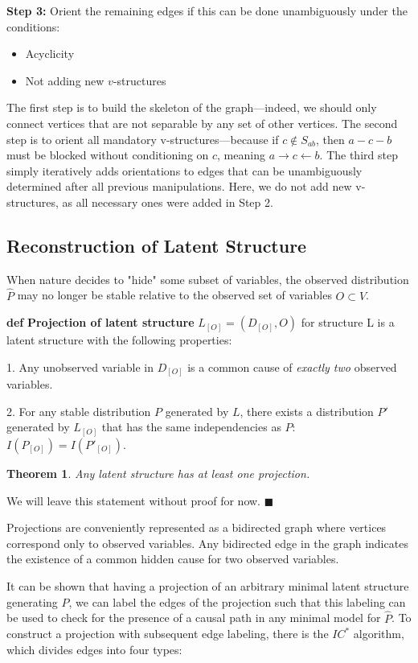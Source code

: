 \documentclass[fleqn]{article}
\def\define#1{\textbf{def} \textbf{#1}}
\newtheorem{theorem}{Theorem}
\numberwithin{equation}{section}
\numberwithin{theorem}{section}
\numberwithin{figure}{section}
\numberwithin{lemma}{section}
\numberwithin{corollary}{section}
\begin{document}
\textbf{Step 3:} Orient the remaining edges if this can be done unambiguously under the conditions:
\begin{itemize}
	\item Acyclicity
	\item Not adding new $v$-structures
\end{itemize}

The first step is to build the skeleton of the graph—indeed, we should only connect vertices that are not separable by any set of other vertices. The second step is to orient all mandatory v-structures—because if $c \notin S_{ab}$, then $a - c - b$ must be blocked without conditioning on $c$, meaning $a \rightarrow c \leftarrow b$. The third step simply iteratively adds orientations to edges that can be unambiguously determined after all previous manipulations. Here, we do not add new v-structures, as all necessary ones were added in Step 2.

\subsection*{Reconstruction of Latent Structure}

When nature decides to "hide" some subset of variables, the observed distribution $\hat P$ may no longer be stable relative to the observed set of variables $O \subset V$.

\define{Projection of latent structure} $L_{[O]} = (D_{[O]}, O)$ for structure L is a latent structure with the following properties:

1. Any unobserved variable in $D_{[O]}$ is a common cause of \textit{exactly two} observed variables.

2. For any stable distribution $P$ generated by $L$, there exists a distribution $P'$ generated by $L_{[O]}$ that has the same independencies as $P$: $I(P_{[O]}) = I(P'_{[O]})$.

\begin{theorem}
	Any latent structure has at least one projection.
\end{theorem}

We will leave this statement without proof for now.
$\blacksquare$

Projections are conveniently represented as a bidirected graph where vertices correspond only to observed variables. Any bidirected edge in the graph indicates the existence of a common hidden cause for two observed variables.

It can be shown that having a projection of an arbitrary minimal latent structure generating $\hat P$, we can label the edges of the projection such that this labeling can be used to check for the presence of a causal path in any minimal model for $\hat P$. To construct a projection with subsequent edge labeling, there is the $IC^*$ algorithm, which divides edges into four types:
\end{document}
